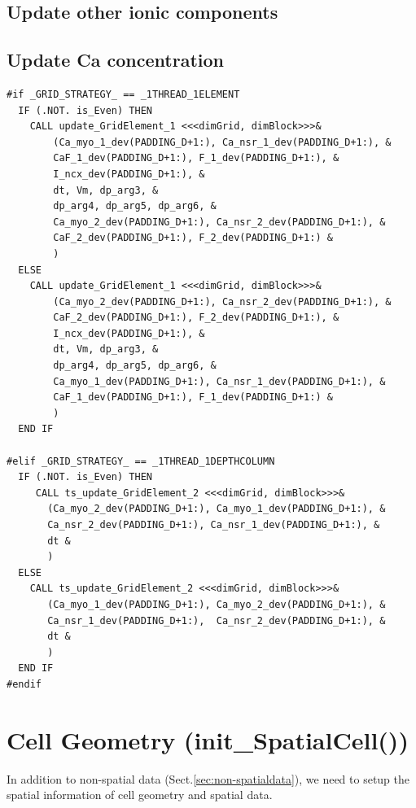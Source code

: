 \subsection{Update other ionic components}
\label{sec:update_nonCa}



\subsection{Update Ca concentration}
\label{sec:update_Camyo_Cansr}

\begin{lstlisting}
#if _GRID_STRATEGY_ == _1THREAD_1ELEMENT
  IF (.NOT. is_Even) THEN
    CALL update_GridElement_1 <<<dimGrid, dimBlock>>>&
        (Ca_myo_1_dev(PADDING_D+1:), Ca_nsr_1_dev(PADDING_D+1:), &
        CaF_1_dev(PADDING_D+1:), F_1_dev(PADDING_D+1:), &
        I_ncx_dev(PADDING_D+1:), &
        dt, Vm, dp_arg3, &
        dp_arg4, dp_arg5, dp_arg6, &
        Ca_myo_2_dev(PADDING_D+1:), Ca_nsr_2_dev(PADDING_D+1:), &
        CaF_2_dev(PADDING_D+1:), F_2_dev(PADDING_D+1:) &
        )
  ELSE
    CALL update_GridElement_1 <<<dimGrid, dimBlock>>>&
        (Ca_myo_2_dev(PADDING_D+1:), Ca_nsr_2_dev(PADDING_D+1:), &
        CaF_2_dev(PADDING_D+1:), F_2_dev(PADDING_D+1:), &
        I_ncx_dev(PADDING_D+1:), &
        dt, Vm, dp_arg3, &
        dp_arg4, dp_arg5, dp_arg6, &
        Ca_myo_1_dev(PADDING_D+1:), Ca_nsr_1_dev(PADDING_D+1:), &
        CaF_1_dev(PADDING_D+1:), F_1_dev(PADDING_D+1:) &
        )
  END IF

#elif _GRID_STRATEGY_ == _1THREAD_1DEPTHCOLUMN
  IF (.NOT. is_Even) THEN
     CALL ts_update_GridElement_2 <<<dimGrid, dimBlock>>>&
       (Ca_myo_2_dev(PADDING_D+1:), Ca_myo_1_dev(PADDING_D+1:), &
       Ca_nsr_2_dev(PADDING_D+1:), Ca_nsr_1_dev(PADDING_D+1:), &
       dt &
       )
  ELSE
    CALL ts_update_GridElement_2 <<<dimGrid, dimBlock>>>&
       (Ca_myo_1_dev(PADDING_D+1:), Ca_myo_2_dev(PADDING_D+1:), &
       Ca_nsr_1_dev(PADDING_D+1:),  Ca_nsr_2_dev(PADDING_D+1:), &
       dt &
       )
  END IF
#endif
\end{lstlisting}



\section{Cell Geometry (init\_SpatialCell())}
\label{sec:spat-cell-geom}

In addition to non-spatial data (Sect.\ref{sec:non-spatialdata}), we need to setup the
spatial information of cell geometry and spatial data. 

